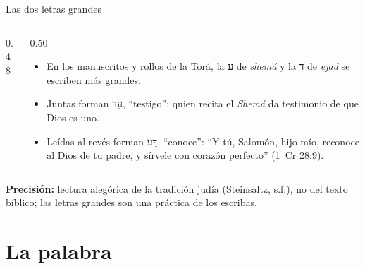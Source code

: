 \documentclass[hyperref={bookmarks=false},aspectratio=169]{beamer}
\newcommand{\heb}[1]{\mbox{\foreignlanguage{hebrew}{#1}}}
\newcommand{\SENOR}{S{\fontsize{0.78em}{1em}\selectfont EÑOR}}
\newcommand{\precision}[1]{{\footnotesize\color{gris}\textbf{Precisión:} #1}}
\begin{document}
\begin{frame}{Las dos letras grandes}
\begin{columns}[c,onlytextwidth]
\begin{column}{0.48\textwidth}
\centering
{}
\end{column}
\begin{column}{0.50\textwidth}\small
\begin{itemize}
\item En los manuscritos y rollos de la Torá, la \heb{ע} de \emph{shemá} y la \heb{ד} de \emph{ejad} se escriben más grandes.
\item Juntas forman \heb{עֵד}, ``testigo'': quien recita el \emph{Shemá} da testimonio de que Dios es uno.
\item Leídas al revés forman \heb{דַּע}, ``conoce'': ``Y tú, Salomón, hijo mío, reconoce al Dios de tu padre, y sírvele con corazón perfecto'' (1~Cr 28:9).
\end{itemize}
\end{column}
\end{columns}\par\smallskip
\precision{lectura alegórica de la tradición judía (Steinsaltz, s.f.), no del texto bíblico; las letras grandes son una práctica de los escribas.}
\end{frame}

\section{La palabra}
\end{document}
